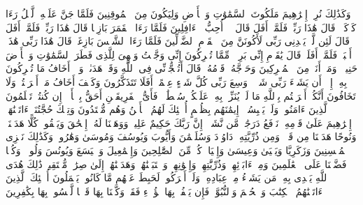 \startbuffer[\q:6:75]
وَكَذَٰلِكَ نُرِیۤ إِبۡرَٰهِیمَ مَلَكُوتَ ٱلسَّمَٰوَٰتِ وَٱلۡأَرۡضِ وَلِیَكُونَ مِنَ ٱلۡمُوقِنِینَ%
\stopbuffer
\startbuffer[\q:6:76]
فَلَمَّا جَنَّ عَلَیۡهِ ٱلَّیۡلُ رَءَا كَوۡكَبࣰاۖ قَالَ هَٰذَا رَبِّیۖ فَلَمَّاۤ أَفَلَ قَالَ لَاۤ أُحِبُّ ٱلۡءَافِلِینَ%
\stopbuffer
\startbuffer[\q:6:77]
فَلَمَّا رَءَا ٱلۡقَمَرَ بَازِغࣰا قَالَ هَٰذَا رَبِّیۖ فَلَمَّاۤ أَفَلَ قَالَ لَئِن لَّمۡ یَهۡدِنِی رَبِّی لَأَكُونَنَّ مِنَ ٱلۡقَوۡمِ ٱلضَّاۤلِّینَ%
\stopbuffer
\startbuffer[\q:6:78]
فَلَمَّا رَءَا ٱلشَّمۡسَ بَازِغَةࣰ قَالَ هَٰذَا رَبِّی هَٰذَاۤ أَكۡبَرُۖ فَلَمَّاۤ أَفَلَتۡ قَالَ یَٰقَوۡمِ إِنِّی بَرِیۤءࣱ مِّمَّا تُشۡرِكُونَ%
\stopbuffer
\startbuffer[\q:6:79]
إِنِّی وَجَّهۡتُ وَجۡهِیَ لِلَّذِی فَطَرَ ٱلسَّمَٰوَٰتِ وَٱلۡأَرۡضَ حَنِیفࣰاۖ وَمَاۤ أَنَا۠ مِنَ ٱلۡمُشۡرِكِینَ%
\stopbuffer
\startbuffer[\q:6:80]
وَحَاۤجَّهُۥ قَوۡمُهُۥۚ قَالَ أَتُحَٰۤجُّوۤنِّی فِی ٱللَّهِ وَقَدۡ هَدَىٰنِۚ وَلَاۤ أَخَافُ مَا تُشۡرِكُونَ بِهِۦۤ إِلَّاۤ أَن یَشَاۤءَ رَبِّی شَیۡءࣰاۚ وَسِعَ رَبِّی كُلَّ شَیۡءٍ عِلۡمًاۚ أَفَلَا تَتَذَكَّرُونَ%
\stopbuffer
\startbuffer[\q:6:81]
وَكَیۡفَ أَخَافُ مَاۤ أَشۡرَكۡتُمۡ وَلَا تَخَافُونَ أَنَّكُمۡ أَشۡرَكۡتُم بِٱللَّهِ مَا لَمۡ یُنَزِّلۡ بِهِۦ عَلَیۡكُمۡ سُلۡطَٰنࣰاۚ فَأَیُّ ٱلۡفَرِیقَیۡنِ أَحَقُّ بِٱلۡأَمۡنِۖ إِن كُنتُمۡ تَعۡلَمُونَ%
\stopbuffer
\startbuffer[\q:6:82]
ٱلَّذِینَ ءَامَنُوا۟ وَلَمۡ یَلۡبِسُوۤا۟ إِیمَٰنَهُم بِظُلۡمٍ أُو۟لَٰۤئِكَ لَهُمُ ٱلۡأَمۡنُ وَهُم مُّهۡتَدُونَ%
\stopbuffer
\startbuffer[\q:6:83]
وَتِلۡكَ حُجَّتُنَاۤ ءَاتَیۡنَٰهَاۤ إِبۡرَٰهِیمَ عَلَىٰ قَوۡمِهِۦۚ نَرۡفَعُ دَرَجَٰتࣲ مَّن نَّشَاۤءُۗ إِنَّ رَبَّكَ حَكِیمٌ عَلِیمࣱ%
\stopbuffer
\startbuffer[\q:6:84]
وَوَهَبۡنَا لَهُۥۤ إِسۡحَٰقَ وَیَعۡقُوبَۚ كُلًّا هَدَیۡنَاۚ وَنُوحًا هَدَیۡنَا مِن قَبۡلُۖ وَمِن ذُرِّیَّتِهِۦ دَاوُۥدَ وَسُلَیۡمَٰنَ وَأَیُّوبَ وَیُوسُفَ وَمُوسَىٰ وَهَٰرُونَۚ وَكَذَٰلِكَ نَجۡزِی ٱلۡمُحۡسِنِینَ%
\stopbuffer
\startbuffer[\q:6:85]
وَزَكَرِیَّا وَیَحۡیَىٰ وَعِیسَىٰ وَإِلۡیَاسَۖ كُلࣱّ مِّنَ ٱلصَّٰلِحِینَ%
\stopbuffer
\startbuffer[\q:6:86]
وَإِسۡمَٰعِیلَ وَٱلۡیَسَعَ وَیُونُسَ وَلُوطࣰاۚ وَكُلࣰّا فَضَّلۡنَا عَلَى ٱلۡعَٰلَمِینَ%
\stopbuffer
\startbuffer[\q:6:87]
وَمِنۡ ءَابَاۤئِهِمۡ وَذُرِّیَّٰتِهِمۡ وَإِخۡوَٰنِهِمۡۖ وَٱجۡتَبَیۡنَٰهُمۡ وَهَدَیۡنَٰهُمۡ إِلَىٰ صِرَٰطࣲ مُّسۡتَقِیمࣲ%
\stopbuffer
\startbuffer[\q:6:88]
ذَٰلِكَ هُدَى ٱللَّهِ یَهۡدِی بِهِۦ مَن یَشَاۤءُ مِنۡ عِبَادِهِۦۚ وَلَوۡ أَشۡرَكُوا۟ لَحَبِطَ عَنۡهُم مَّا كَانُوا۟ یَعۡمَلُونَ%
\stopbuffer
\startbuffer[\q:6:89]
أُو۟لَٰۤئِكَ ٱلَّذِینَ ءَاتَیۡنَٰهُمُ ٱلۡكِتَٰبَ وَٱلۡحُكۡمَ وَٱلنُّبُوَّةَۚ فَإِن یَكۡفُرۡ بِهَا هَٰۤؤُلَاۤءِ فَقَدۡ وَكَّلۡنَا بِهَا قَوۡمࣰا لَّیۡسُوا۟ بِهَا بِكَٰفِرِینَ%
\stopbuffer
\startbuffer[\q:6:90]
